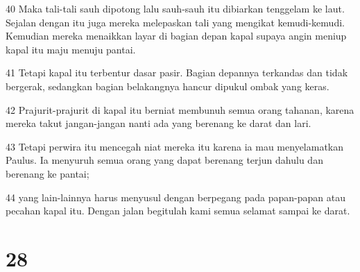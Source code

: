 \par 40 Maka tali-tali sauh dipotong lalu sauh-sauh itu dibiarkan tenggelam ke laut. Sejalan dengan itu juga mereka melepaskan tali yang mengikat kemudi-kemudi. Kemudian mereka menaikkan layar di bagian depan kapal supaya angin meniup kapal itu maju menuju pantai.
\par 41 Tetapi kapal itu terbentur dasar pasir. Bagian depannya terkandas dan tidak bergerak, sedangkan bagian belakangnya hancur dipukul ombak yang keras.
\par 42 Prajurit-prajurit di kapal itu berniat membunuh semua orang tahanan, karena mereka takut jangan-jangan nanti ada yang berenang ke darat dan lari.
\par 43 Tetapi perwira itu mencegah niat mereka itu karena ia mau menyelamatkan Paulus. Ia menyuruh semua orang yang dapat berenang terjun dahulu dan berenang ke pantai;
\par 44 yang lain-lainnya harus menyusul dengan berpegang pada papan-papan atau pecahan kapal itu. Dengan jalan begitulah kami semua selamat sampai ke darat.

\chapter{28}

